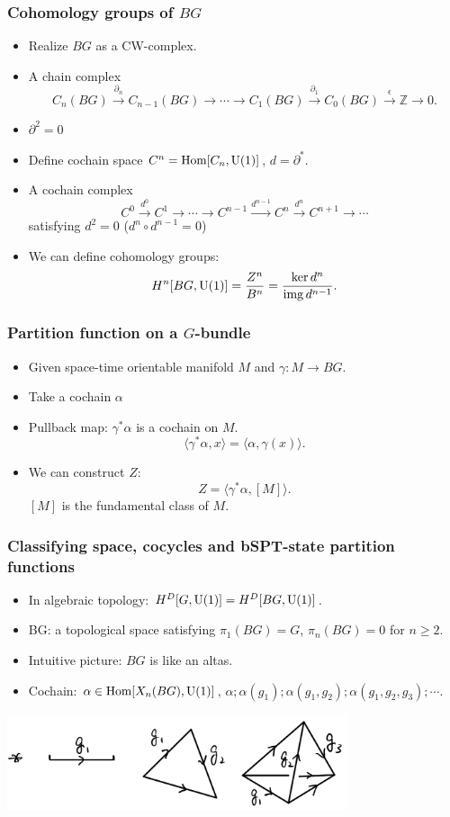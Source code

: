 \documentclass[xcolor=table, aspectratio=169,ignorenonframetext]{beamer}
\DeclareMathOperator{\img}{img}
\DeclareMathOperator{\hhom}{Hom}
\newcommand{\uone}{\text U(1)}
\begin{document}
\begin{frame}
	\frametitle{Cohomology groups of $BG$}
	\begin{itemize}
		\item Realize $BG$ as a CW-complex.
		\item A chain complex
		\[C_n(BG)\xrightarrow{\partial_n}
		C_{n-1}(BG)\rightarrow\cdots\rightarrow
		C_1(BG)\xrightarrow{\partial_1}
		C_0(BG)\xrightarrow{\epsilon}\mathbb Z\rightarrow0.\]
		\item $\partial^2=0$
		\item Define cochain space $C^n=\hhom[C_n,\text U(1)]$, $d = \partial^\ast$.
		\item A cochain complex
		\[C^0\xrightarrow{d^0}C^1\rightarrow\cdots\rightarrow C^{n-1}\xrightarrow{d^{n-1}}C^n\xrightarrow{d^n}C^{n+1}\rightarrow\cdots\]
		satisfying $d^2=0$ ($d^n\circ d^{n-1}=0$)
		\item We can define cohomology groups:
		\[H^n[BG,\text U(1)] = \frac{Z^n}{B^n} = \frac{\ker d^n}{\img d^{n-1}}.\]
	\end{itemize}
\end{frame}

\begin{frame}
	\frametitle{Partition function on a $G$-bundle}
	\begin{itemize}
		\item Given space-time orientable manifold $M$ and $\gamma:M\rightarrow BG$.
		\item Take a cochain $\alpha$
		\item Pullback map: $\gamma^\ast\alpha$ is a cochain on $M$.
		\[\langle \gamma^\ast\alpha, x\rangle = \langle \alpha,\gamma(x)\rangle.\]
		\item We can construct $Z$:
		\[Z = \langle\gamma^\ast\alpha, [M]\rangle.\]
		$[M]$ is the fundamental class of $M$.
	\end{itemize}
\end{frame}
\begin{frame}
	\frametitle{Classifying space, cocycles and bSPT-state partition functions}
	\begin{itemize}
		\item In algebraic topology:
		$H^D[G, \uone] = H^D[BG, \uone]$.
		\item BG: a topological space satisfying $\pi_1(BG)=G$, $\pi_n(BG)=0$ for $n\geq 2$.
		\item Intuitive picture: $BG$ is like an altas.
		\item Cochain: $\alpha\in \hhom[X_n(BG), \uone]$, $\alpha; \alpha(g_1);\alpha(g_1,g_2);\alpha(g_1,g_2,g_3);\cdots$.
	\end{itemize}
	\begin{center}
		\includegraphics[width=10cm]{../chainmap/bg-std}
	\end{center}
\end{frame}
\end{document}
